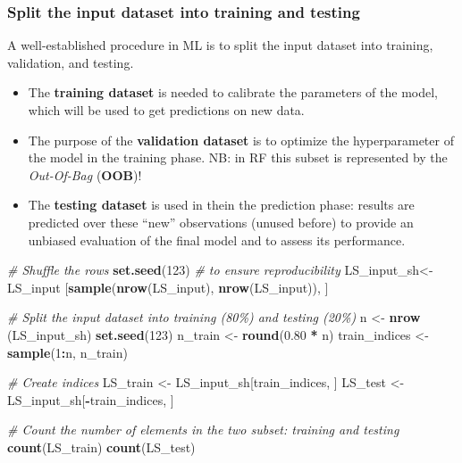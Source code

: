 \documentclass[
]{article}
\newenvironment{Shaded}{\begin{snugshade}}{\end{snugshade}}
\newcommand{\CommentTok}[1]{\textcolor[rgb]{0.56,0.35,0.01}{\textit{#1}}}
\newcommand{\DecValTok}[1]{\textcolor[rgb]{0.00,0.00,0.81}{#1}}
\newcommand{\FloatTok}[1]{\textcolor[rgb]{0.00,0.00,0.81}{#1}}
\newcommand{\FunctionTok}[1]{\textcolor[rgb]{0.13,0.29,0.53}{\textbf{#1}}}
\newcommand{\NormalTok}[1]{#1}
\newcommand{\OtherTok}[1]{\textcolor[rgb]{0.56,0.35,0.01}{#1}}
\newcommand{\SpecialCharTok}[1]{\textcolor[rgb]{0.81,0.36,0.00}{\textbf{#1}}}
\providecommand{\tightlist}{%
  \setlength{\itemsep}{0pt}\setlength{\parskip}{0pt}}
\begin{document}
\subsubsection{Split the input dataset into training and testing}\label{split-the-input-dataset-into-training-and-testing}

A well-established procedure in ML is to split the input dataset into training, validation, and testing.

\begin{itemize}
\tightlist
\item
  The \textbf{training dataset} is needed to calibrate the parameters of the model, which will be used to get predictions on new data.
\item
  The purpose of the \textbf{validation dataset} is to optimize the hyperparameter of the model in the training phase. NB: in RF this subset is represented by the \emph{Out-Of-Bag} (\textbf{OOB})!
\item
  The \textbf{testing dataset} is used in thein the prediction phase: results are predicted over these ``new'' observations (unused before) to provide an unbiased evaluation of the final model and to assess its performance.
\end{itemize}

\begin{Shaded}
\begin{Highlighting}[]
\CommentTok{\# Shuffle the rows}
\FunctionTok{set.seed}\NormalTok{(}\DecValTok{123}\NormalTok{) }\CommentTok{\# to ensure reproducibility }
\NormalTok{LS\_input\_sh}\OtherTok{\textless{}{-}}\NormalTok{LS\_input [}\FunctionTok{sample}\NormalTok{(}\FunctionTok{nrow}\NormalTok{(LS\_input), }\FunctionTok{nrow}\NormalTok{(LS\_input)), ] }

\CommentTok{\# Split the input dataset into training (80\%) and testing (20\%)}
\NormalTok{n }\OtherTok{\textless{}{-}} \FunctionTok{nrow}\NormalTok{ (LS\_input\_sh)}
\FunctionTok{set.seed}\NormalTok{(}\DecValTok{123}\NormalTok{)}
\NormalTok{n\_train }\OtherTok{\textless{}{-}} \FunctionTok{round}\NormalTok{(}\FloatTok{0.80} \SpecialCharTok{*}\NormalTok{ n) }
\NormalTok{train\_indices }\OtherTok{\textless{}{-}} \FunctionTok{sample}\NormalTok{(}\DecValTok{1}\SpecialCharTok{:}\NormalTok{n, n\_train)}

\CommentTok{\# Create indices}
\NormalTok{LS\_train }\OtherTok{\textless{}{-}}\NormalTok{ LS\_input\_sh[train\_indices, ]  }
\NormalTok{LS\_test }\OtherTok{\textless{}{-}}\NormalTok{ LS\_input\_sh[}\SpecialCharTok{{-}}\NormalTok{train\_indices, ]}

\CommentTok{\# Count the number of elements in the two subset: training and testing}
\FunctionTok{count}\NormalTok{(LS\_train)}
\FunctionTok{count}\NormalTok{(LS\_test)}
\end{Highlighting}
\end{Shaded}
\end{document}
